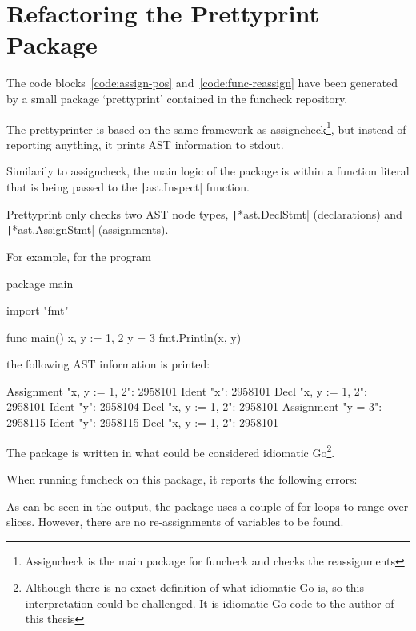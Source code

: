 
\section{Refactoring the Prettyprint Package}


The code blocks~\ref{code:assign-pos} and~\ref{code:func-reassign} have been
generated by a small package `prettyprint' contained in the funcheck repository.

The prettyprinter is based on the same framework as assigncheck\footnote{Assigncheck
is the main package for funcheck and checks the reassignments}, but instead
of reporting anything, it prints AST information to \gls{stdout}.

Similarily to assigncheck, the main logic of the package is within a
function literal that is being passed to the \texttt|ast.Inspect|
function.

Prettyprint only checks two AST node types, \texttt|*ast.DeclStmt|
(declarations) and \texttt|*ast.AssignStmt| (assignments).

For example, for the program
\begin{gocode}
package main

import "fmt"

func main() {
	x, y := 1, 2
	y = 3
	fmt.Println(x, y)
}
\end{gocode}
the following AST information is printed:

\begin{gocode}
Assignment "x, y := 1, 2": 2958101
		Ident "x": 2958101
				Decl "x, y := 1, 2": 2958101
		Ident "y": 2958104
				Decl "x, y := 1, 2": 2958101
Assignment "y = 3": 2958115
		Ident "y": 2958115
				Decl "x, y := 1, 2": 2958101
\end{gocode}
The package is written in what could be considered idiomatic Go\footnote{Although
there is no exact definition of what idiomatic Go is, so this interpretation could
be challenged. It is idiomatic Go code to the author of this thesis}. %

When running funcheck on this package, it reports the following errors:

As can be seen in the output, the package uses a couple of for loops to range over
slices. However, there are no re-assignments of variables to be found.

